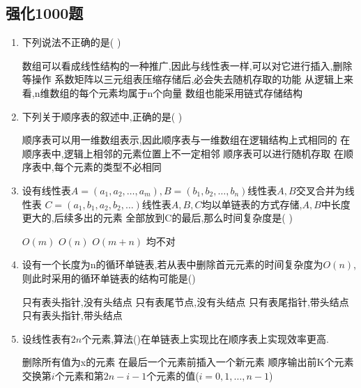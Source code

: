 \documentclass[12pt, a4paper, oneside, UTF8]{ctexbook}
\begin{document}
\subsection{强化1000题}
\begin{enumerate}
    \item 下列说法不正确的是(   ) 
    \begin{choices}[1]
        \task 数组可以看成线性结构的一种推广,因此与线性表一样,可以对它进行插入,删除等操作 
        \task 系数矩阵以三元组表压缩存储后,必会失去随机存取的功能
        \task 从逻辑上来看,n维数组的每个元素均属于n个向量
        \task 数组也能采用链式存储结构
    \end{choices}

    \item 下列关于顺序表的叙述中,正确的是(   ) 
    \begin{choices}[1]
        \task 顺序表可以用一维数组表示,因此顺序表与一维数组在逻辑结构上式相同的
        \task 在顺序表中,逻辑上相邻的元素位置上不一定相邻
        \task 顺序表可以进行随机存取
        \task 在顺序表中,每个元素的类型不必相同 
    \end{choices}

    \item 设有线性表$A=(a_1,a_2,\ldots,a_m),B=(b_1,b_2,\ldots,b_n)$线性表$A,B$交叉合并为线性表
    $C=(a_1,b_1,a_2,b_2,\ldots)$线性表$A,B,C$均以单链表的方式存储,$A,B$中长度更大的,后续多出的元素
    全部放到C的最后,那么时间复杂度是(    )
    \begin{choices}
        \task $O(m)$ \task $O(n)$ \task $O(m+n)$ \task 均不对
    \end{choices}

    \item 设有一个长度为n的循环单链表,若从表中删除首元元素的时间复杂度为$O(n)$,则此时采用的循环单链表的结构可能是()
    \begin{choices}[2]
        \task 只有表头指针,没有头结点 \task 只有表尾节点,没有头结点 
        \task 只有表尾指针,带头结点 \task 只有表头指针,带头结点
    \end{choices}

    \item 设线性表有$2n$个元素,算法()在单链表上实现比在顺序表上实现效率更高. 
    \begin{choices}[1]
        \task 删除所有值为x的元素 
        \task 在最后一个元素前插入一个新元素 
        \task 顺序输出前K个元素 
        \task 交换第$i$个元素和第$2n-i-1$个元素的值($i=0,1,\ldots,n-1$) 
    \end{choices}


\end{enumerate}
\end{document}
